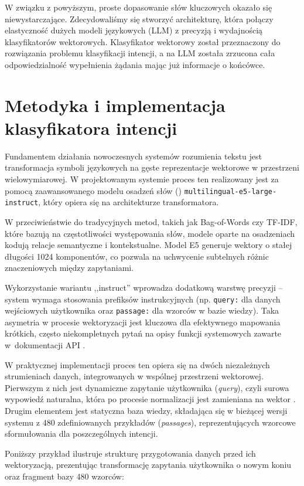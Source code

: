 W związku z powyższym, proste dopasowanie słów kluczowych okazało się niewystarczające. Zdecydowaliśmy się stworzyć architekturę, która połączy elastyczność dużych modeli językowych (LLM) z precyzją i wydajnością klasyfikatorów wektorowych. Klasyfikator wektorowy został przeznaczony do rozwiązania problemu klasyfikacji intencji, a na LLM została zrzucona cała odpowiedzialność wypełnienia żądania mając już informacje o końcówce.

\section{Metodyka i implementacja klasyfikatora intencji}

Fundamentem działania nowoczesnych systemów rozumienia tekstu jest transformacja symboli językowych na gęste reprezentacje wektorowe w przestrzeni wielowymiarowej. W projektowanym systemie proces ten realizowany jest za pomocą zaawansowanego modelu osadzeń słów () \texttt{multilingual-e5-large-instruct}, który opiera się na architekturze transformatora.

W przeciwieństwie do tradycyjnych metod, takich jak Bag-of-Words czy TF-IDF, które bazują na częstotliwości występowania słów, modele oparte na osadzeniach kodują relacje semantyczne i kontekstualne. Model E5 generuje wektory o stałej długości 1024 komponentów, co pozwala na uchwycenie subtelnych różnic znaczeniowych między zapytaniami.

Wykorzystanie wariantu ,,instruct'' wprowadza dodatkową warstwę precyzji -- system wymaga stosowania prefiksów instrukcyjnych (np. \texttt{query:} dla danych wejściowych użytkownika oraz \texttt{passage:} dla wzorców w bazie wiedzy). 
Taka asymetria w procesie wektoryzacji jest kluczowa dla efektywnego mapowania krótkich, często niekompletnych pytań na opisy funkcji systemowych zawarte w~dokumentacji API \cite{reimers2019}.

W praktycznej implementacji proces ten opiera się na dwóch niezależnych strumieniach danych, integrowanych w wspólnej przestrzeni wektorowej. Pierwszym z nich jest dynamiczne zapytanie użytkownika (\textit{query}), czyli surowa wypowiedź naturalna, która po procesie normalizacji jest zamieniana na wektor . Drugim elementem jest statyczna baza wiedzy, składająca się w bieżącej wersji systemu z 480 zdefiniowanych przykładów (\textit{passages}), reprezentujących wzorcowe sformułowania dla poszczególnych intencji.

Poniższy przykład ilustruje strukturę przygotowania danych przed ich wektoryzacją, prezentując transformację zapytania użytkownika o nowym koniu oraz fragment bazy 480 wzorców:

